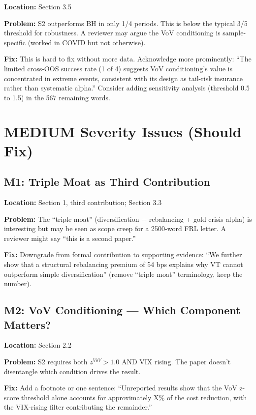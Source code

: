 \documentclass[12pt,a4paper]{article}
\begin{document}
\textbf{Location:} Section 3.5

\textbf{Problem:} S2 outperforms BH in only 1/4 periods. This is below the typical 3/5 threshold for robustness. A reviewer may argue the VoV conditioning is sample-specific (worked in COVID but not otherwise).

\textbf{Fix:} This is hard to fix without more data. Acknowledge more prominently: ``The limited cross-OOS success rate (1 of 4) suggests VoV conditioning's value is concentrated in extreme events, consistent with its design as tail-risk insurance rather than systematic alpha.'' Consider adding sensitivity analysis (threshold 0.5 to 1.5) in the 567 remaining words.

\section*{\textcolor{warncolor}{MEDIUM Severity Issues (Should Fix)}}

\subsection*{M1: Triple Moat as Third Contribution}

\textbf{Location:} Section 1, third contribution; Section 3.3

\textbf{Problem:} The ``triple moat'' (diversification + rebalancing + gold crisis alpha) is interesting but may be seen as scope creep for a 2500-word FRL letter. A reviewer might say ``this is a second paper.''

\textbf{Fix:} Downgrade from formal contribution to supporting evidence: ``We further show that a structural rebalancing premium of 54 bps explains why VT cannot outperform simple diversification'' (remove ``triple moat'' terminology, keep the number).

\subsection*{M2: VoV Conditioning --- Which Component Matters?}

\textbf{Location:} Section 2.2

\textbf{Problem:} S2 requires both $z^{VoV} > 1.0$ AND VIX rising. The paper doesn't disentangle which condition drives the result.

\textbf{Fix:} Add a footnote or one sentence: ``Unreported results show that the VoV z-score threshold alone accounts for approximately X\% of the cost reduction, with the VIX-rising filter contributing the remainder.''
\end{document}

